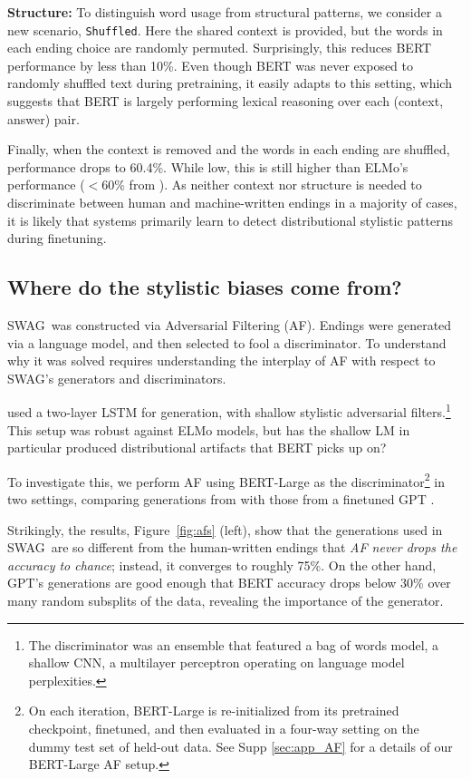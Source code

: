  \textbf{Structure:} To distinguish word usage from structural patterns, we consider a new scenario, \texttt{Shuffled}. Here the shared context is provided, but the words in each ending choice are randomly permuted. Surprisingly, this reduces BERT performance by less than 10\%. Even though BERT was never exposed to randomly shuffled text during pretraining, it easily adapts to this setting, which suggests that BERT is largely performing lexical reasoning over each (context, answer) pair. 

Finally, when the context is removed and the words in each ending are shuffled, performance drops to 60.4\%. While low, this is still higher than ELMo's performance (${<}60$\% from \citealp{zellers2018swagaf}). As neither context nor structure is needed to discriminate between human and machine-written endings in a majority of cases, it is likely that systems primarily learn to detect distributional stylistic patterns during finetuning.

\subsection{Where do the stylistic biases come from?} {SWAG}~was constructed via Adversarial Filtering (AF). Endings were generated via a language model, and then selected to fool a discriminator. To understand why it was solved requires understanding the interplay of AF with respect to {SWAG}'s generators and discriminators.

\citet{zellers2018swagaf} used a two-layer LSTM for generation, with shallow stylistic adversarial filters.\footnote{The discriminator was an ensemble that featured a bag of words model, a shallow CNN, a multilayer perceptron operating on language model perplexities.} This setup was robust against ELMo models, but has the shallow LM in particular produced distributional artifacts that BERT picks up on?

To investigate this, we perform AF using BERT-Large as the discriminator\footnote{On each iteration, BERT-Large is re-initialized from its pretrained checkpoint, finetuned, and then evaluated in a four-way setting on the dummy test set of held-out data. See Supp \ref{sec:app_AF} for a details of our BERT-Large AF setup.} in two settings, comparing generations from \citet{zellers2018swagaf} with those from a finetuned GPT \cite{radford2018improving}.

Strikingly, the results, Figure~\ref{fig:afs} (left), show that the generations used in {SWAG}~are so different from the human-written endings that \emph{AF never drops the accuracy to chance}; instead, it converges to roughly 75\%. On the other hand, GPT's generations are good enough that BERT accuracy drops below 30\% over many random subsplits of the data, revealing the importance of the generator.

